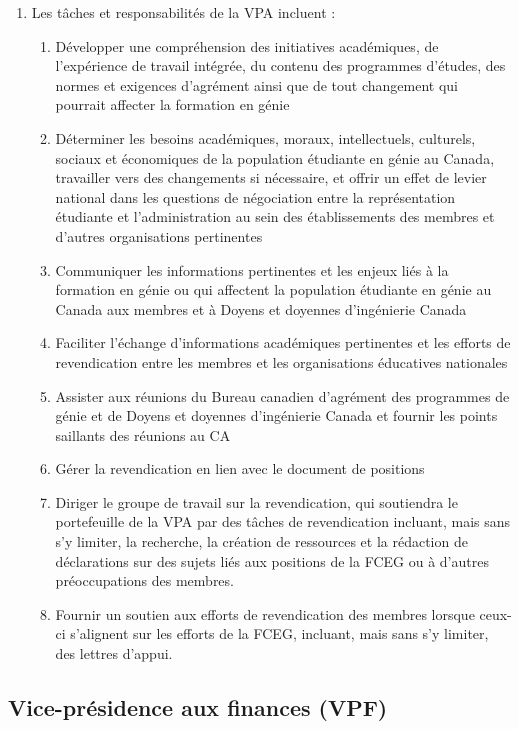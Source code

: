 \begin{enumerate}
 \item Les tâches et responsabilités de la VPA incluent :
  \begin{enumerate}
   \item Développer une compréhension des initiatives académiques, de l'expérience de travail intégrée, du contenu des programmes d'études, des normes et exigences d'agrément ainsi que de tout changement qui pourrait affecter la formation en génie
   \item Déterminer les besoins académiques, moraux, intellectuels, culturels, sociaux et économiques de la population étudiante en génie au Canada, travailler vers des changements si nécessaire, et offrir un effet de levier national dans les questions de négociation entre la représentation étudiante et l'administration au sein des établissements des membres et d'autres organisations pertinentes
   \item Communiquer les informations pertinentes et les enjeux liés à la formation en génie ou qui affectent la population étudiante en génie au Canada aux membres et à Doyens et doyennes d'ingénierie Canada
   \item Faciliter l'échange d'informations académiques pertinentes et les efforts de revendication entre les membres et les organisations éducatives nationales
   \item Assister aux réunions du Bureau canadien d'agrément des programmes de génie et de Doyens et doyennes d'ingénierie Canada et fournir les points saillants des réunions au CA
   \item Gérer la revendication en lien avec le document de positions
   \item Diriger le groupe de travail sur la revendication, qui soutiendra le portefeuille de la VPA par des tâches de revendication incluant, mais sans s'y limiter, la recherche, la création de ressources et la rédaction de déclarations sur des sujets liés aux positions de la FCEG ou à d'autres préoccupations des membres.
   \item Fournir un soutien aux efforts de revendication des membres lorsque ceux-ci s'alignent sur les efforts de la FCEG, incluant, mais sans s'y limiter, des lettres d'appui.
  \end{enumerate}
\end{enumerate}

\subsection{Vice-présidence aux finances (VPF)}
\label{executif-national-vice-presidence-aux-finances-vpf}

